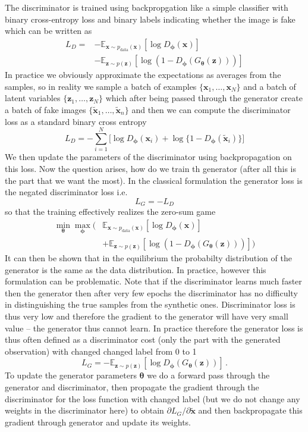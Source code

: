 \documentclass[a5paper]{article}
\newcommand{\Ebb}{\mathbb{E}}
\begin{document}
The discriminator is trained using backpropgation like a simple classifier with binary
cross-entropy loss and binary labels indicating whether the image is fake which can be written as
\[
\begin{split}
   L_D = &-\Ebb_{\bm{x} \sim p_\text{data}(\bm{x})} [\log D_{\bm{\phi}}(\bm{x})] \\
         &-\Ebb_{\bm{z} \sim p(\bm{z})}[\log(1 - D_{\bm{\phi}}(G_{\bm{\theta}}(\bm{z})))]
\end{split}
\]
In practice we obviously approximate the expectations as averages from the samples, so in reality we
sample a batch of examples $\{\bm{x}_1, \ldots, \bm{x}_N\}$ and a batch of latent variables
$\{\bm{z}_1, \ldots, \bm{z}_N\}$ which after being passed through the generator create a batch of
fake images $\{\bm{\tilde{x}}_1, \ldots, \bm{\tilde{x}}_n\}$ and then we can compute the
discriminator loss as a standard binary cross entropy
\[
   L_D = - \sum_{i=1}^N \bigg[ \log D_{\bm{\phi}}(\bm{x}_i) + \log \{1 - D_{\bm{\phi}}(\bm{\tilde{x}}_i)\} \bigg]
\]
We then update the parameters of the discriminator using backpropagation on this loss. Now the
question arises, how do we train th generator (after all this is the part that we want the most). In
the classical formulation the generator loss is the negated discriminator loss i.e.
\[
   L_G = -L_D
\]
so that the training effectively realizes the zero-sum game
\[
\begin{split}
   \min_{\bm{\theta}} \max_{\bm{\phi}} \bigg( &\Ebb_{\bm{x} \sim p_\text{data}(\bm{x})} [\log D_{\bm{\phi}}(\bm{x})] \\
                                       &+ \Ebb_{\bm{z} \sim p(\bm{z})}[\log(1 - D_{\bm{\phi}}(G_{\bm{\theta}}(\bm{z})))] \bigg)
\end{split}
\]
It can then be shown that in the equilibrium the probabilty distribution of the generator is the
same as the data distribution. In practice, however this formulation can be problematic. Note that
if the discriminator learns much faster then the generator then after very few epochs the
discriminator has no difficulty in distinguishing the true samples from the synthetic ones.
Discriminator loss is thus very low and therefore the gradient to the generator will have very small
value -- the generator thus cannot learn. In practice therefore the generator loss is thus often
defined as a discriminator cost (only the part with the generated observation) with changed changed
label from 0 to 1
\[
   L_G = - \Ebb_{\bm{z} \sim p(\bm{z})} [\log D_{\bm{\phi}}(G_{\bm{\theta}}(\bm{z}))]\,.
\]
To update the generator parameters $\bm{\theta}$ we do a forward pass through the generator and
discriminator, then propagate the gradient through the discriminator for the loss function with
changed label (but we do not change any weights in the discriminator here) to obtain $\partial L_G /
\partial \bm{\tilde{x}}$ and then backpropagate this gradient through generator and update its
weights.
\end{document}
